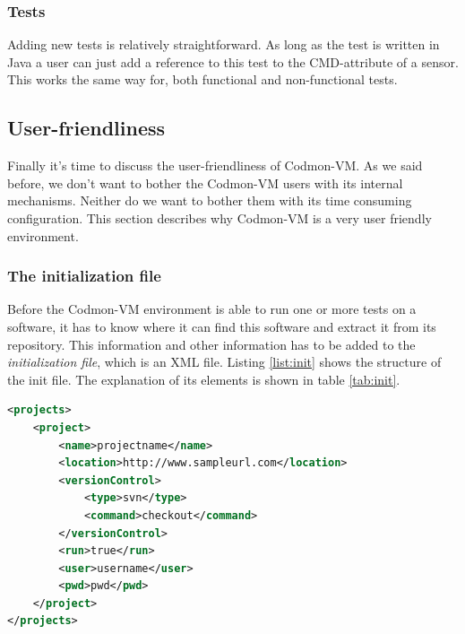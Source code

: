 \documentclass{article}
\newcommand{\project}{Codmon-VM}
\begin{document}
\subsubsection{Tests}
\label{imp:tests}
Adding new tests is relatively straightforward. As long as the test is written in Java a user can just add a reference to this test to the CMD-attribute of a sensor. This works the same way for, both functional 
and non-functional tests.


\subsection{User-friendliness}
\label{imp-user}
Finally it's time to discuss the user-friendliness of \project{}. As we said before, we don't want to bother the \project{} users with its internal mechanisms. Neither do we want to bother them with 
its time consuming configuration. This section describes why \project{} is a very user friendly environment.\\

\subsubsection{The initialization file}
\label{imp:init}
\noindent Before the \project{} environment is able to run one or more tests on a software, it has to know where it can find this software and extract it from its repository. This information and other information has to be added to 
the \emph{initialization file}, which is an XML file. Listing \ref{list:init} shows the structure of the init file. The explanation of its elements is shown in table \ref{tab:init}. \\

\begin{lstlisting}[frame=shadowbox, language=XML,showstringspaces=false]
 <projects>
	<project>
		<name>projectname</name>
		<location>http://www.sampleurl.com</location>
		<versionControl>
			<type>svn</type>
			<command>checkout</command>
		</versionControl>
		<run>true</run>
		<user>username</user>
		<pwd>pwd</pwd>
	</project>
</projects>
\end{lstlisting} 
\end{document}
